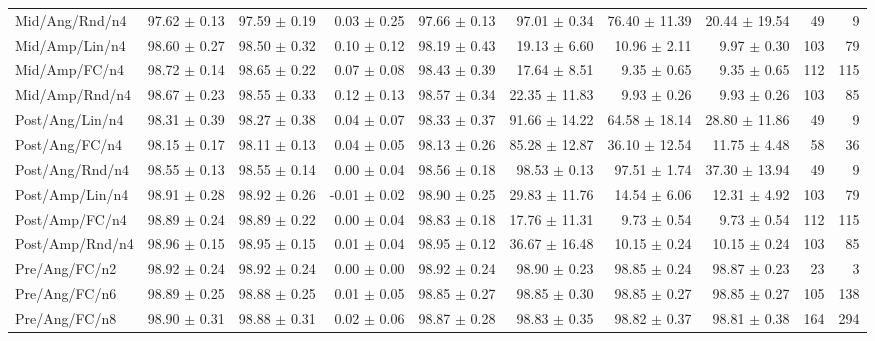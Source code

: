 \begin{table}[!t]
\begin{tabular}{lrrrrrrrrr}
Mid/Ang/Rnd/n4 & 97.62 $\pm$ 0.13 & 97.59 $\pm$ 0.19 & 0.03 $\pm$ 0.25 & 97.66 $\pm$ 0.13 & 97.01 $\pm$ 0.34 & 76.40 $\pm$ 11.39 & 20.44 $\pm$ 19.54 & 49 & 9 \\
Mid/Amp/Lin/n4 & 98.60 $\pm$ 0.27 & 98.50 $\pm$ 0.32 & 0.10 $\pm$ 0.12 & 98.19 $\pm$ 0.43 & 19.13 $\pm$ 6.60 & 10.96 $\pm$ 2.11 & 9.97 $\pm$ 0.30 & 103 & 79 \\
Mid/Amp/FC/n4 & 98.72 $\pm$ 0.14 & 98.65 $\pm$ 0.22 & 0.07 $\pm$ 0.08 & 98.43 $\pm$ 0.39 & 17.64 $\pm$ 8.51 & 9.35 $\pm$ 0.65 & 9.35 $\pm$ 0.65 & 112 & 115 \\
Mid/Amp/Rnd/n4 & 98.67 $\pm$ 0.23 & 98.55 $\pm$ 0.33 & 0.12 $\pm$ 0.13 & 98.57 $\pm$ 0.34 & 22.35 $\pm$ 11.83 & 9.93 $\pm$ 0.26 & 9.93 $\pm$ 0.26 & 103 & 85 \\
Post/Ang/Lin/n4 & 98.31 $\pm$ 0.39 & 98.27 $\pm$ 0.38 & 0.04 $\pm$ 0.07 & 98.33 $\pm$ 0.37 & 91.66 $\pm$ 14.22 & 64.58 $\pm$ 18.14 & 28.80 $\pm$ 11.86 & 49 & 9 \\
Post/Ang/FC/n4 & 98.15 $\pm$ 0.17 & 98.11 $\pm$ 0.13 & 0.04 $\pm$ 0.05 & 98.13 $\pm$ 0.26 & 85.28 $\pm$ 12.87 & 36.10 $\pm$ 12.54 & 11.75 $\pm$ 4.48 & 58 & 36 \\
Post/Ang/Rnd/n4 & 98.55 $\pm$ 0.13 & 98.55 $\pm$ 0.14 & 0.00 $\pm$ 0.04 & 98.56 $\pm$ 0.18 & 98.53 $\pm$ 0.13 & 97.51 $\pm$ 1.74 & 37.30 $\pm$ 13.94 & 49 & 9 \\
Post/Amp/Lin/n4 & 98.91 $\pm$ 0.28 & 98.92 $\pm$ 0.26 & -0.01 $\pm$ 0.02 & 98.90 $\pm$ 0.25 & 29.83 $\pm$ 11.76 & 14.54 $\pm$ 6.06 & 12.31 $\pm$ 4.92 & 103 & 79 \\
Post/Amp/FC/n4 & 98.89 $\pm$ 0.24 & 98.89 $\pm$ 0.22 & 0.00 $\pm$ 0.04 & 98.83 $\pm$ 0.18 & 17.76 $\pm$ 11.31 & 9.73 $\pm$ 0.54 & 9.73 $\pm$ 0.54 & 112 & 115 \\
Post/Amp/Rnd/n4 & 98.96 $\pm$ 0.15 & 98.95 $\pm$ 0.15 & 0.01 $\pm$ 0.04 & 98.95 $\pm$ 0.12 & 36.67 $\pm$ 16.48 & 10.15 $\pm$ 0.24 & 10.15 $\pm$ 0.24 & 103 & 85 \\
Pre/Ang/FC/n2 & 98.92 $\pm$ 0.24 & 98.92 $\pm$ 0.24 & 0.00 $\pm$ 0.00 & 98.92 $\pm$ 0.24 & 98.90 $\pm$ 0.23 & 98.85 $\pm$ 0.24 & 98.87 $\pm$ 0.23 & 23 & 3 \\
Pre/Ang/FC/n6 & 98.89 $\pm$ 0.25 & 98.88 $\pm$ 0.25 & 0.01 $\pm$ 0.05 & 98.85 $\pm$ 0.27 & 98.85 $\pm$ 0.30 & 98.85 $\pm$ 0.27 & 98.85 $\pm$ 0.27 & 105 & 138 \\
Pre/Ang/FC/n8 & 98.90 $\pm$ 0.31 & 98.88 $\pm$ 0.31 & 0.02 $\pm$ 0.06 & 98.87 $\pm$ 0.28 & 98.83 $\pm$ 0.35 & 98.82 $\pm$ 0.37 & 98.81 $\pm$ 0.38 & 164 & 294 \\

\end{tabular}
\end{table}
